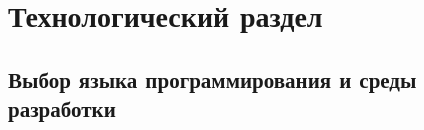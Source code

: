 \chapter{Технологический раздел}
\label{cha:tech}

  \section{Выбор языка программирования и среды разработки}